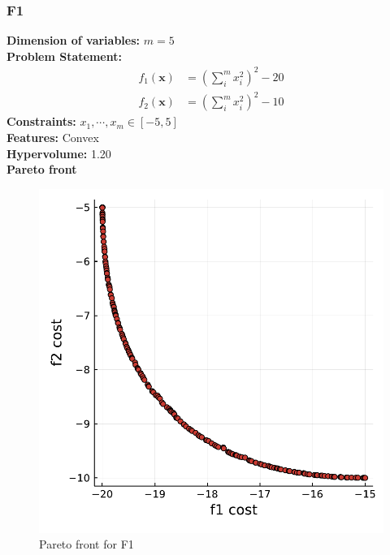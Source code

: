\documentclass[11pt,oneside,onecolumn,openright]{article}
\begin{document}
   \subsubsection{F1~\cite{brockhoff2016using}}
       \textbf{Dimension of variables: }$m=5$\\
  \noindent\textbf{Problem Statement: }
   \begin{equation}
   \begin{aligned}
  f_{1}(\mathbf{x})&=\left(\sum_{i}^m x_{i}^{2}\right)^{2}-20\\
  f_{2}(\mathbf{x})&=\left(\sum_{i}^m x_{i}^{2}\right)^{2}-10
  \end{aligned}
  \end{equation}
  \noindent\textbf{Constraints: } $x_{1}, \cdots,x_{m} \in[-5,5]$\\
  \noindent\textbf{Features: } Convex\\
  \noindent\textbf{Hypervolume: } 1.20\\
  \noindent\textbf{Pareto front}
      \begin{figure}[H]
      \centering
      \includegraphics[width=12cm]{fig/F1.pdf}
      \cprotect\caption{Pareto front for F1}
      \end{figure}
\end{document}
